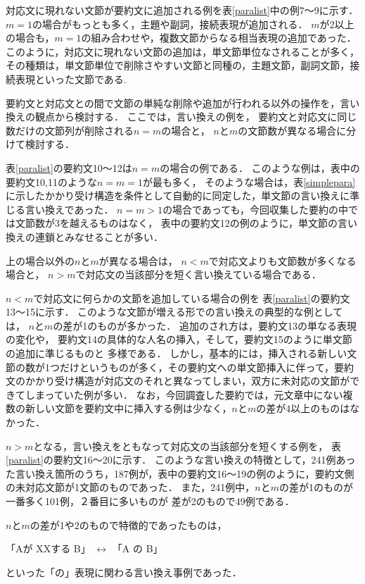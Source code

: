対応文に現れない文節が要約文に追加される例を表\ref{paralist}中の例7〜9に示す．
$m=1$の場合がもっとも多く，主題や副詞，接続表現が追加される．
$m$が2以上の場合も，$m=1$の組み合わせや，複数文節からなる相当表現の追加であった．
このように，対応文に現れない文節の追加は，単文節単位なされることが多く，その種類は，単文節単位で削除さやすい文節と同種の，主題文節，副詞文節，接続表現といった文節である.


要約文と対応文との間で文節の単純な削除や追加が行われる以外の操作を，言い換えの観点から検討する．
ここでは，言い換えの例を，
要約文と対応文に同じ数だけの文節列が削除される$n=m$の場合と，
$n$と$m$の文節数が異なる場合に分けて検討する．

表\ref{paralist}の要約文10〜12は$n=m$の場合の例である．
このような例は，表中の要約文10,11のような$n=m=1$が最も多く，
そのような場合は，表\ref{simplepara}に示したかかり受け構造を条件として自動的に同定した，単文節の言い換えに準じる言い換えであった．
$n=m>1$の場合であっても，今回収集した要約の中では文節数が3を越えるものはなく，
表中の要約文12の例のように，単文節の言い換えの連鎖とみなせることが多い．

上の場合以外の$n$と$m$が異なる場合は，
$n<m$で対応文よりも文節数が多くなる場合と，
$n>m$で対応文の当該部分を短く言い換えている場合である．

$n<m$で対応文に何らかの文節を追加している場合の例を
表\ref{paralist}の要約文13〜15に示す．
このような文節が増える形での言い換えの典型的な例としては，
$n$と$m$の差が1のものが多かった．
追加のされ方は，要約文13の単なる表現の変化や，
要約文14の具体的な人名の挿入，そして，要約文15のように単文節の追加に準じるものと
多様である．
しかし，基本的には，挿入される新しい文節の数が1つだけというものが多く，その要約文への単文節挿入に伴って，要約文のかかり受け構造が対応文のそれと異なってしまい，双方に未対応の文節ができてしまっていた例が多い．
なお，今回調査した要約では，元文章中にない複数の新しい文節を要約文中に挿入する例は少なく，$n$と$m$の差が4以上のものはなかった．


$n>m$となる，言い換えをともなって対応文の当該部分を短くする例を，
表\ref{paralist}の要約文16〜20に示す．
このような言い換えの特徴として，241例あった言い換え箇所のうち，187例が，表中の要約文16〜19の例のように，要約文側の未対応文節が1文節のものであった．
また，241例中，$n$と$m$の差が1のものが一番多く101例，２番目に多いものが
差が2のもので49例である．

$n$と$m$の差が1や2のもので特徴的であったものは，
\begin{center}
「Aが XXする B」 $\leftrightarrow$ 「A の B」
\end{center}
といった「の」表現に関わる言い換え事例であった．

